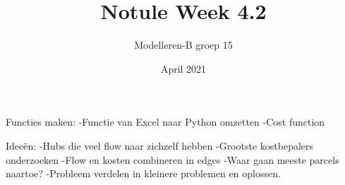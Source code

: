 \documentclass{article}
\title{Notule Week 4.2}
\author{Modelleren-B groep 15}
\date{April 2021}
\begin{document}
Functies maken:
-Functie van Excel naar Python omzetten
-Cost function

Ideeën:
-Hubs die veel flow naar zichzelf hebben
-Grootste kostbepalers onderzoeken
-Flow en kosten combineren in edges
-Waar gaan meeste parcels naartoe?
-Probleem verdelen in kleinere problemen en oplossen.
\end{document}
